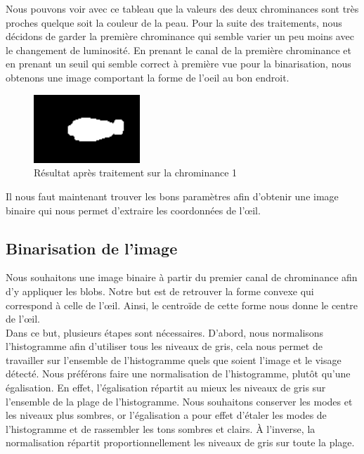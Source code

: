 Nous pouvons voir avec ce tableau que la valeurs des deux chrominances sont très proches quelque soit
la couleur de la peau. Pour la suite des traitements, nous décidons de garder la première chrominance qui semble
varier un peu moins avec le changement de luminosité. En prenant le canal de la première chrominance et en 
prenant un seuil qui semble correct à première vue pour la binarisation, nous obtenons une image comportant la forme de l'oeil au bon endroit.

\begin{figure}[H]
 \center
 \includegraphics[width=4cm]{image/result_yuv.png}
 \caption{Résultat après traitement sur la chrominance 1}
\end{figure}

Il nous faut maintenant trouver les bons paramètres afin d'obtenir une image binaire qui nous permet d'extraire les 
coordonnées de l'œil.

\subsection{Binarisation de l'image}
Nous souhaitons une image binaire à partir du premier canal de chrominance afin d'y appliquer les blobs. 
Notre but est de retrouver la forme convexe qui correspond à celle de l'œil. Ainsi, le centroïde de cette 
forme nous donne le centre de l'œil.\\

Dans ce but, plusieurs étapes sont nécessaires. D'abord, nous normalisons l'histogramme afin d'utiliser 
tous les niveaux de gris, cela nous permet de travailler sur l'ensemble de l'histogramme quels que soient
l'image et le visage détecté. Nous préférons faire une normalisation de l'histogramme, plutôt qu'une 
égalisation. En effet, l'égalisation répartit au mieux les niveaux de gris sur l'ensemble de 
la plage de l'histogramme. Nous souhaitons conserver les modes et les niveaux plus sombres, or l'égalisation 
a pour effet d'étaler les modes de l'histogramme et de rassembler les tons sombres et clairs. À l'inverse, 
la normalisation répartit proportionnellement les niveaux de gris sur toute la plage. 

